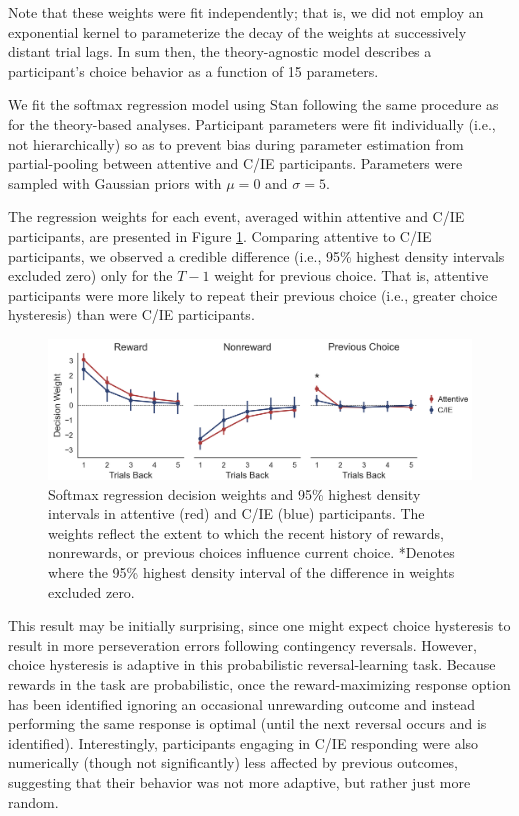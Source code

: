 \documentclass[a4paper,notitlepage,12pt]{article}
\begin{document}
\begin{refsection}[supp]
Note that these weights were fit independently; that is, we did not employ an exponential kernel to parameterize the decay of the weights at successively distant trial lags. In sum then, the theory-agnostic model describes a participant's choice behavior as a function of 15 parameters. 

We fit the softmax regression model using Stan following the same procedure as for the theory-based analyses. Participant parameters were fit individually (i.e., not hierarchically)  so as to prevent bias during parameter estimation from partial-pooling between attentive and C/IE participants. Parameters were sampled with Gaussian priors with $\mu = 0$ and $\sigma = 5$.

The regression weights for each event, averaged within attentive and C/IE participants, are presented in Figure \ref{fig:regression}. Comparing attentive to C/IE participants, we observed a credible difference (i.e., 95\% highest density intervals excluded zero) only for the $T-1$ weight for previous choice. That is, attentive participants were more likely to repeat their previous choice (i.e., greater choice hysteresis) than were C/IE participants.

\begin{figure}[!t]
    \includegraphics[width=16cm]{../figures/main_03c.png}
    \centering
    \captionsetup{width=0.88\textwidth}
    \caption{Softmax regression decision weights and 95\% highest density intervals in attentive (red) and C/IE (blue) participants. The weights reflect the extent to which the recent history of rewards, nonrewards, or previous choices influence current choice. *Denotes where the 95\% highest density interval of the difference in weights excluded zero.}
    \label{fig:regression}
\end{figure}

This result may be initially surprising, since one might expect choice hysteresis to result in more perseveration errors following contingency reversals. However, choice hysteresis is adaptive in this probabilistic reversal-learning task. Because rewards in the task are probabilistic, once the reward-maximizing response option has been identified ignoring an occasional unrewarding outcome and instead performing the same response is optimal (until the next reversal occurs and is identified). Interestingly, participants engaging in C/IE responding were also numerically (though not significantly) less affected by previous outcomes, suggesting that their behavior was not more adaptive, but rather just more random.


\end{refsection}
\end{document}
